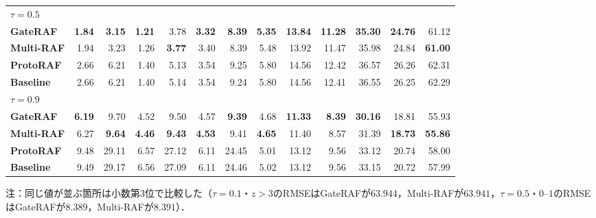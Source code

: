\documentclass[twocolumn, lastpage]{jarticle}
\begin{document}
\begin{table}[t]
\begin{tabular}{lrrrrrrrrrrrr}
    \hline
    \multicolumn{13}{l}{$\tau=0.5$} \\
    \quad \textbf{GateRAF} & \textbf{1.84} & \textbf{3.15} & \textbf{1.21} & 3.78 & \textbf{3.32} & \textbf{8.39} & \textbf{5.35} & \textbf{13.84} & \textbf{11.28} & \textbf{35.30} & \textbf{24.76} & 61.12 \\
    \quad \textbf{Multi-RAF} & 1.94 & 3.23 & 1.26 & \textbf{3.77} & 3.40 & 8.39 & 5.48 & 13.92 & 11.47 & 35.98 & 24.84 & \textbf{61.00} \\
    \quad \textbf{ProtoRAF} & 2.66 & 6.21 & 1.40 & 5.13 & 3.54 & 9.25 & 5.80 & 14.56 & 12.42 & 36.57 & 26.26 & 62.31 \\
    \quad \textbf{Baseline} & 2.66 & 6.21 & 1.40 & 5.14 & 3.54 & 9.24 & 5.80 & 14.56 & 12.41 & 36.55 & 26.25 & 62.29 \\
    \hline
    \multicolumn{13}{l}{$\tau=0.9$} \\
    \quad \textbf{GateRAF} & \textbf{6.19} & 9.70 & 4.52 & 9.50 & 4.57 & \textbf{9.39} & 4.68 & \textbf{11.33} & \textbf{8.39} & \textbf{30.16} & 18.81 & 55.93 \\
    \quad \textbf{Multi-RAF} & 6.27 & \textbf{9.64} & \textbf{4.46} & \textbf{9.43} & \textbf{4.53} & 9.41 & \textbf{4.65} & 11.40 & 8.57 & 31.39 & \textbf{18.73} & \textbf{55.86} \\
    \quad \textbf{ProtoRAF} & 9.48 & 29.11 & 6.57 & 27.12 & 6.11 & 24.45 & 5.01 & 13.12 & 9.56 & 33.12 & 20.74 & 58.00 \\
    \quad \textbf{Baseline} & 9.49 & 29.17 & 6.56 & 27.09 & 6.11 & 24.46 & 5.02 & 13.12 & 9.56 & 33.15 & 20.72 & 57.99 \\
    \hline
    \end{tabular}
    \par\vspace{2pt}
    {\footnotesize 注：同じ値が並ぶ箇所は小数第3位で比較した（$\tau=0.1$・$z>3$のRMSEはGateRAFが$63.944$，Multi-RAFが$63.941$，$\tau=0.5$・$0$--$1$のRMSEはGateRAFが$8.389$，Multi-RAFが$8.391$）．}
\end{table}
\end{document}
